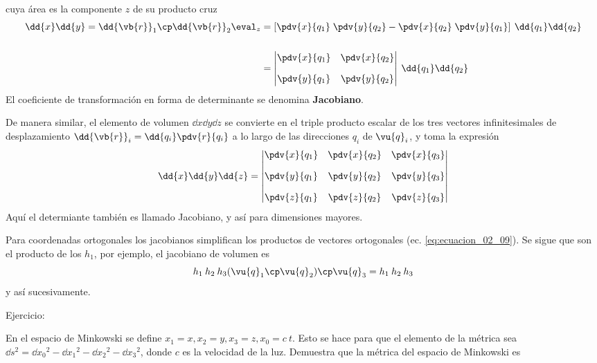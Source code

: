 cuya área es la componente $z$ de su producto cruz
\begin{align}
\begin{aligned}
 \dd{x} \dd{y} = \dd{\vb{r}}_{1} \cp \dd{\vb{r}}_{2} \eval_{z} &= \left[ \pdv{x}{q_{1}} \; \pdv{y}{q_{2}} - \pdv{x}{q_{2}} \; \pdv{y}{q_{1}} \right] \: \dd{q_{1}} \dd{q_{2}} \\[1.5em]
&= \begin{vmatrix}
\displaystyle{\pdv{x}{q_{1}}} & \displaystyle{\pdv{x}{q_{2}}} \\[1em]
\displaystyle{\pdv{y}{q_{1}}} & \displaystyle{\pdv{y}{q_{2}}} 
\end{vmatrix} \: \dd{q_{1}} \dd{q_{2}}
\end{aligned}
\label{eq:ecuacion_02_15}
\end{align}
El coeficiente de transformación en forma de determinante se denomina \textbf{Jacobiano}.
\par
De manera similar, el elemento de volumen $\dd{x} \dd{y} \dd{z}$ se convierte en el triple producto escalar de los tres vectores infinitesimales de desplazamiento $\displaystyle{\dd{\vb{r}}_{i}  = \dd{q_{i}} \pdv{r} {q_{i}}} $ a lo largo de las direcciones $q_{i}$ de $\vu{q}_{i}$, y toma la expresión
\begin{equation}
\dd{x} \dd{y} \dd{z} = \begin{vmatrix}
\displaystyle{\pdv{x}{q_{1}}} & \displaystyle{\pdv{x}{q_{2}}} & \displaystyle{\pdv{x}{q_{3}}} \\[1em]
\displaystyle{\pdv{y}{q_{1}}} & \displaystyle{\pdv{y}{q_{2}}} & \displaystyle{\pdv{y}{q_{3}}} \\[1em]
\displaystyle{\pdv{z}{q_{1}}} & \displaystyle{\pdv{z}{q_{2}}} & \displaystyle{\pdv{z}{q_{3}}} \\
\end{vmatrix}
\label{eq:ecuacion_02_16}
\end{equation}
Aquí el determiante también es llamado Jacobiano, y así para dimensiones mayores.
\par
Para coordenadas ortogonales los jacobianos simplifican los productos de vectores ortogonales (ec. \ref{eq:ecuacion_02_09}). Se sigue que son el producto de los $h_{1}$, por ejemplo, el jacobiano de volumen es
\[ h_{1} \: h_{2} \: h_{3} (\vu{q}_{1} \cp \vu{q}_{2} ) \cp \vu{q}_{3} = h_{1} \: h_{2} \: h_{3} \]
y así sucesivamente.
\par
Ejercicio:
\par
En el espacio de Minkowski se define $x_{1} = x, x_{2} = y, x_{3} = z, x_{0} = c \: t$. Esto se hace para que el elemento de la métrica sea $\dd{s^{2}} = \dd{x_{0}}^{2} - \dd{x_{1}}^{2} - \dd{x_{2}}^{2} - \dd{x_{3}}^{2}$, donde $c$ es la velocidad de la luz. Demuestra que la métrica del espacio de Minkowski es

